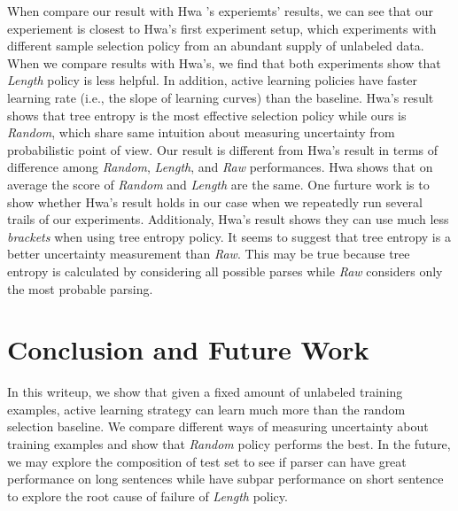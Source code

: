 \documentclass[11pt,letterpaper]{article}
\begin{document}
When compare our result with Hwa 's experiemts' results, we can see that our experiement is closest 
to Hwa's first experiment setup, which experiments with different sample selection policy from an abundant supply of unlabeled data. When we
compare results with Hwa's, we find that both experiments show that \emph{Length} policy is less helpful. In addition, active learning
policies have faster learning rate (i.e., the slope of learning curves) than the baseline. Hwa's result shows that tree entropy is the most
effective selection policy while ours is \emph{Random}, which share same intuition about measuring uncertainty from probabilistic point of view.
Our result is different from Hwa's result in terms of difference among \emph{Random}, \emph{Length}, and \emph{Raw} performances. Hwa shows
that on average the score of \emph{Random} and \emph{Length} are the same. One furture work is to show whether Hwa's result holds in our case
when we repeatedly run several trails of our experiments. Additionaly, Hwa's result shows they can use much less \emph{brackets} when using
tree entropy policy. It seems to suggest that tree entropy is a better uncertainty measurement than \emph{Raw}. This may be true because
tree entropy is calculated by considering all possible parses while \emph{Raw} considers only the most probable parsing.

\section{Conclusion and Future Work}
\label{ssec:first}

In this writeup, we show that given a fixed amount of unlabeled training examples, active learning strategy can learn much more than 
the random selection baseline. We compare different ways of measuring uncertainty about training examples and show that \emph{Random}
policy performs the best. In the future, we may explore the composition of test set to see if parser can have great performance
on long sentences while have subpar performance on short sentence to explore the root cause of failure of \emph{Length} policy.


\end{document}
